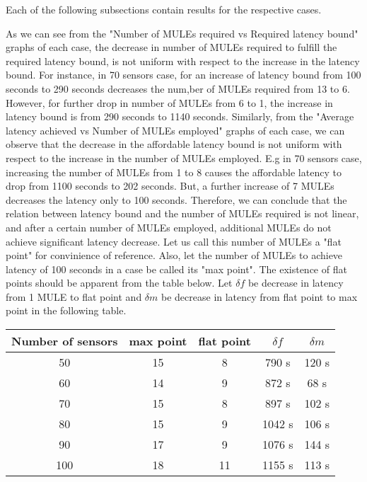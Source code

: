 Each of the following subsections contain results for the respective cases.

As we can see from the "Number of MULEs required vs Required latency bound" graphs of each case, the decrease in number of MULEs required to fulfill the required latency bound, is not uniform with respect to the increase in the latency bound. For instance, in 70 sensors case, for an increase of latency bound from 100 seconds to 290 seconds decreases the num,ber of MULEs required from 13 to 6. However, for further drop in number of MULEs from 6 to 1, the increase in latency bound is from 290 seconds to 1140 seconds. Similarly, from the "Average latency achieved vs Number of MULEs employed" graphs of each case, we can observe that the decrease in the affordable latency bound is not uniform with respect to the increase in the number of MULEs employed. E.g in 70 sensors case, increasing the number of MULEs from 1 to 8 causes the affordable latency to drop from 1100 seconds to 202 seconds. But, a further increase of 7 MULEs decreases the latency only to 100 seconds. Therefore, we can conclude that the relation between latency bound and the number of MULEs required is not linear, and after a certain number of MULEs employed, additional MULEs do not achieve significant latency decrease. Let us call this number of MULEs a "flat point" for convinience of reference. Also, let the number of MULEs to achieve latency of 100 seconds in a case be called its "max point". The existence of flat points should be apparent from the table below. Let $\delta f$ be decrease in latency from 1 MULE to flat point and $\delta m$ be decrease in latency from flat point to max point in the following table.

\begin{center}
 \begin{tabular}{||c c c c c||} 
 \hline
 Number of sensors & max point & flat point & $\delta f$ & $\delta m$ \\  
 \hline\hline
 50 & 15 & 8 & 790 s & 120 s\\ 
 \hline
 60 & 14 & 9 & 872 s & 68 s\\
 \hline
 70 & 15 & 8 & 897 s & 102 s\\
 \hline
 80 & 15 & 9 & 1042 s & 106 s\\
 \hline
 90 & 17 & 9 & 1076 s & 144 s\\
 \hline
 100 & 18 & 11 & 1155 s & 113 s\\
 \hline
\end{tabular}
\end{center}

